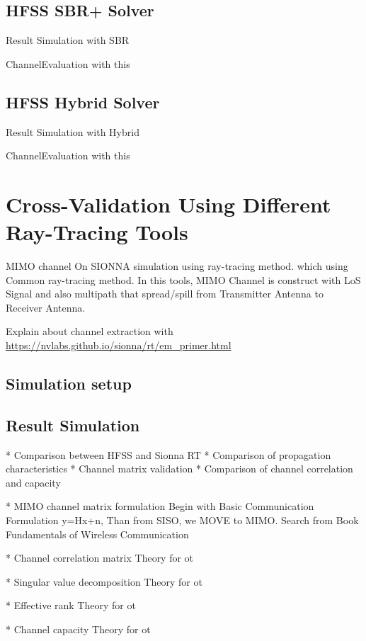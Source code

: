 \subsection{HFSS SBR+ Solver}
Result Simulation with SBR

ChannelEvaluation with this

\subsection{HFSS Hybrid Solver}
Result Simulation with Hybrid

ChannelEvaluation with this


\section{Cross-Validation Using Different Ray-Tracing Tools}
MIMO channel On SIONNA simulation using ray-tracing method. which using Common ray-tracing method. In this tools, MIMO Channel is construct with LoS Signal and also multipath that spread/spill from Transmitter Antenna to Receiver Antenna. 

Explain about channel extraction with \url{https://nvlabs.github.io/sionna/rt/em_primer.html}

\subsection{Simulation setup}
\subsection{Result Simulation}

* Comparison between HFSS and Sionna RT
* Comparison of propagation characteristics
* Channel matrix validation
* Comparison of channel correlation and capacity



* MIMO channel matrix formulation
Begin with Basic Communication Formulation y=Hx+n, Than from SISO, we MOVE to MIMO. Search from Book Fundamentals of Wireless Communication

* Channel correlation matrix
Theory for ot

* Singular value decomposition
Theory for ot

* Effective rank
Theory for ot

* Channel capacity
Theory for ot

